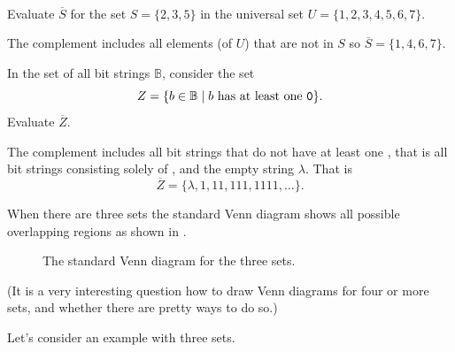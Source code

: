 \begin{exam}
\label{exam_set_complement}
~
    \begin{apart}
        \item Evaluate $\overline{S}$ for the set $S = \{2, 3,5\}$ in the universal set $U= \{1, 2, 3, 4, 5, 6, 7\}$.
           \begin{soln}
               The complement includes all elements (of $U$) that are not in $S$ so $\overline{S} = \{1, 4, 6,7\}$.
           \end{soln}
        \item In the set of all bit strings $\mathbb{B}$, consider the set $$Z = \{b \in \mathbb{B} \mid b \text{ has at least one } \texttt{0}\}.$$  Evaluate $\overline{Z}$.
            \begin{soln}
                The complement includes all bit strings that do not have at least one , that is all bit strings consisting solely of , and the empty string $\lambda$.  That is
                $$\overline{Z} = \{\lambda, 1, 11, 111, 1111, \ldots\}.$$ 
            \end{soln}
    \end{apart}
\end{exam}

When there are three sets the standard Venn diagram shows all possible overlapping regions as shown in . 
\begin{figure}[hbtp]
    \centering
    
    \caption{The standard Venn diagram for the three sets.}
    \label{fig_venn_3sets}
\end{figure}
(It is a very interesting question how to draw Venn diagrams for four or more sets, and whether there are pretty ways to do so.)

Let's consider an example with three sets.

